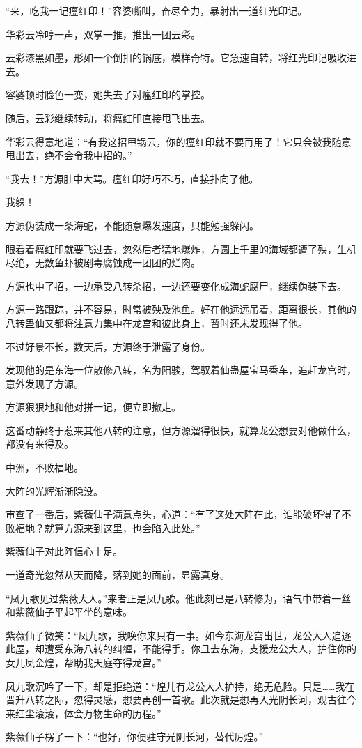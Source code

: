 \begin{this_body}
“来，吃我一记瘟红印！”容婆嘶叫，奋尽全力，暴射出一道红光印记。

华彩云冷哼一声，双掌一推，推出一团云彩。

云彩漆黑如墨，形如一个倒扣的锅底，模样奇特。它急速自转，将红光印记吸收进去。

容婆顿时脸色一变，她失去了对瘟红印的掌控。

随后，云彩继续转动，将瘟红印直接甩飞出去。

华彩云得意地道：“有我这招甩锅云，你的瘟红印就不要再用了！它只会被我随意甩出去，绝不会令我中招的。”

“我去！”方源肚中大骂。瘟红印好巧不巧，直接扑向了他。

我躲！

方源伪装成一条海蛇，不能随意爆发速度，只能勉强躲闪。

眼看着瘟红印就要飞过去，忽然后者猛地爆炸，方圆上千里的海域都遭了殃，生机尽绝，无数鱼虾被剧毒腐蚀成一团团的烂肉。

方源也中了招，一边承受八转杀招，一边还要变化成海蛇腐尸，继续伪装下去。

方源一路跟踪，并不容易，时常被殃及池鱼。好在他远远吊着，距离很长，其他的八转蛊仙又都将注意力集中在龙宫和彼此身上，暂时还未发现得了他。

不过好景不长，数天后，方源终于泄露了身份。

发现他的是东海一位散修八转，名为阳骏，驾驭着仙蛊屋宝马香车，追赶龙宫时，意外发现了方源。

方源狠狠地和他对拼一记，便立即撤走。

这番动静终于惹来其他八转的注意，但方源溜得很快，就算龙公想要对他做什么，都没有来得及。

中洲，不败福地。

大阵的光辉渐渐隐没。

审查了一番后，紫薇仙子满意点头，心道：“有了这处大阵在此，谁能破坏得了不败福地？就算方源来到这里，也会陷入此处。”

紫薇仙子对此阵信心十足。

一道奇光忽然从天而降，落到她的面前，显露真身。

“凤九歌见过紫薇大人。”来者正是凤九歌。他此刻已是八转修为，语气中带着一丝和紫薇仙子平起平坐的意味。

紫薇仙子微笑：“凤九歌，我唤你来只有一事。如今东海龙宫出世，龙公大人追逐此屋，却遭受东海八转的纠缠，不能得手。你且去东海，支援龙公大人，护住你的女儿凤金煌，帮助我天庭夺得龙宫。”

凤九歌沉吟了一下，却是拒绝道：“煌儿有龙公大人护持，绝无危险。只是……我在晋升八转之际，忽得灵感，想要再创一首歌。此次就是想再入光阴长河，观古往今来红尘滚滚，体会万物生命的历程。”

紫薇仙子楞了一下：“也好，你便驻守光阴长河，替代厉煌。”

\end{this_body}

